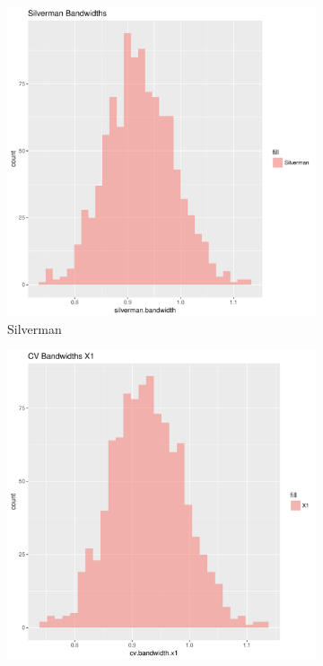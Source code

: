 \begin{figure}[htbp]
    \centering
    \begin{subfigure}[b]{0.3\textwidth}
    \includegraphics[width=\textwidth]{results/unif_100_1_1h/output/bandwidths-silverman}
    \caption{Silverman}
    \label{fig:bandwidths_x1:unif_100_1_1h:s}
    \end{subfigure}
    \begin{subfigure}[b]{0.3\textwidth}
    \includegraphics[width=\textwidth]{results/unif_100_1_1h/output/bandwidths-x1}

\end{subfigure}
\end{figure}

